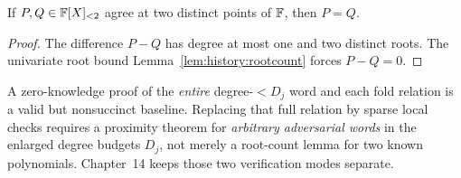 \begin{lemma}\label{lem:full:two-unique}
If $P,Q\in\mathbb{F}[X]_{<2}$ agree at
two distinct points of $\mathbb{F}$,
then $P=Q$.
\end{lemma}
\begin{proof}
The difference $P-Q$ has
degree at most one and
two distinct roots.
The univariate root bound
Lemma~\ref{lem:history:rootcount}
forces $P-Q=0$.
\end{proof}

\begin{remark}
A zero-knowledge proof of the
\emph{entire} degree-$<D_j$ word
and each fold relation is a valid
but nonsuccinct baseline.
Replacing that full relation
by sparse local checks requires
a proximity theorem for
\emph{arbitrary adversarial words}
in the enlarged degree budgets
$D_j$, not merely a root-count
lemma for two known polynomials.
Chapter~14 keeps those two
verification modes separate.
\end{remark}

